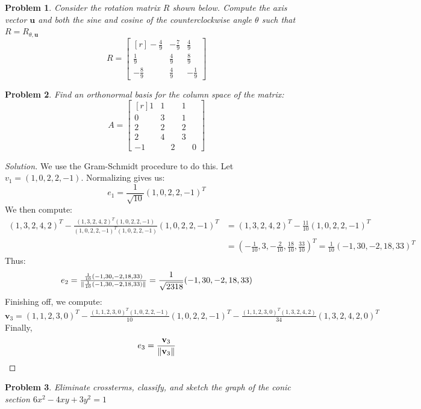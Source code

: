 \documentclass[oneside]{book}
\theoremstyle{mystyle}
\newtheorem{problem}{Problem}[section]
\DeclarePairedDelimiter\norm{\lVert}{\rVert}
\begin{document}
\begin{problem}
Consider the rotation matrix $R$ shown below. Compute the axis vector $\textbf{u}$ and both the sine and cosine of the counterclockwise angle $\theta$ such that $R = R_{\theta,\textbf{u}}$
\begin{equation*}
    R = \begin{bmatrix*}[r] -\frac{4}{9} & -\frac{7}{9} & \frac{4}{9} \\ \frac{1}{9} & \frac{4}{9} & \frac{8}{9} \\ -\frac{8}{9} & \frac{4}{9} & -\frac{1}{9} \end{bmatrix*}
\end{equation*}
\end{problem}
\begin{problem}
Find an orthonormal basis for the column space of the matrix:
\begin{equation*}
    A = \begin{bmatrix*}[r] 1 & 1 & 1 \\ 0 & 3 & 1 \\ 2 & 2 & 2 \\ 2 & 4 & 3 \\ -1 & \phantom{-}2 & \phantom{-}0 \end{bmatrix*}
\end{equation*}
\end{problem}
\begin{proof}[Solution]
We use the Gram-Schmidt procedure to do this. Let $v_{1}=(1,0,2,2,-1)$. Normalizing gives us:
\begin{equation*}
    e_{1} = \frac{1}{\sqrt{10}}(1,0,2,2,-1)^T    
\end{equation*}
We then compute:
\begin{align*}
    (1,3,2,4,2)^T-\tfrac{(1,3,2,4,2)^T(1,0,2,2,-1)}{(1,0,2,2,-1)^T (1,0,2,2,-1)}(1,0,2,2,-1)^{T}&=(1,3,2,4,2)^{T}-\tfrac{11}{10}(1,0,2,2,-1)^{T}\\
    &=(-\tfrac{1}{10},3,-\tfrac{2}{10},\tfrac{18}{10},\tfrac{33}{10})^{T}=\tfrac{1}{10}(-1,30,-2,18,33)^{T}
\end{align*}
Thus:
\begin{equation*}
    e_{2}=\tfrac{\frac{1}{10}(-1,30,-2,18,33)}{\norm{\frac{1}{10}(-1,30,-2,18,33)}}=\frac{1}{\sqrt{2318}}(-1,30,-2,18,33)
\end{equation*}
Finishing off, we compute:
\begin{equation*}
    \mathbf{v}_{3}=(1,1,2,3,0)^{T}-\tfrac{(1,1,2,3,0)^T(1,0,2,2,-1)}{10}(1,0,2,2,-1)^T-\tfrac{(1,1,2,3,0)^T(1,3,2,4,2)}{34}(1,3,2,4,2,0)^{T}
\end{equation*}
Finally,
\begin{equation*}
    e_3 = \frac{\textbf{v}_3}{\norm{\textbf{v}_3}}
\end{equation*}
\end{proof}
\begin{problem}
Eliminate crossterms, classify, and sketch the graph of the conic section $6x^2 - 4xy+3y^2 = 1$
\end{problem}
\end{document}
